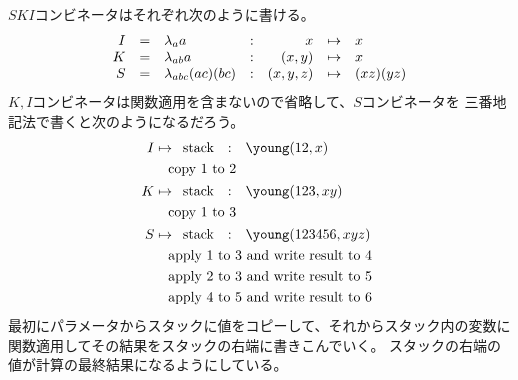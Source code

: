 	$SKI$コンビネータはそれぞれ次のように書ける。
	\begin{equation*}\begin{array}{rclcrcl} %
		I &=& \lfnc{a}{a} &:& x &\mapsto& x \\
		K &=& \lfnc{ab}{a} &:& (x,y) &\mapsto& x \\
		S &=& \lfnc{abc}{(ac)(bc)} &:& (x,y,z) &\mapsto& (xz)(yz) \\
	\end{array}\end{equation*} %
	$K,I$コンビネータは関数適用を含まないので省略して、$S$コンビネータを
	三番地記法で書くと次のようになるだろう。
	\begin{equation*}\begin{split} %
		I &\mapsto \begin{array}{rcl}
			\text{stack} &:& \young(12,x) \\
		\end{array} \\
		& \quad\text{copy }1\text{ to }2 \\
		K &\mapsto \begin{array}{rcl}
			\text{stack} &:& \young(123,xy) \\
		\end{array} \\
		& \quad\text{copy }1\text{ to }3 \\
		S &\mapsto \begin{array}{rcl}
			\text{stack} &:& \young(123456,xyz) \\
		\end{array} \\
		& \quad\text{apply }1\text{ to }3\text{ and write result to }4 \\
		& \quad\text{apply }2\text{ to }3\text{ and write result to }5 \\
		& \quad\text{apply }4\text{ to }5\text{ and write result to }6 \\
	\end{split}\end{equation*} %
	最初にパラメータからスタックに値をコピーして、それからスタック内の変数に
	関数適用してその結果をスタックの右端に書きこんでいく。
	スタックの右端の値が計算の最終結果になるようにしている。

